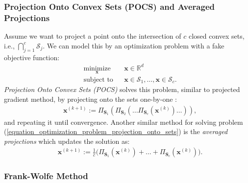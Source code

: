 \documentclass[lang=cn,10pt]{gorgeousnbook}
\numberwithin{equation}{section}%
\numberwithin{figure}{section}%
\begin{document}
\subsubsection{Projection Onto Convex Sets (POCS) and Averaged Projections}


Assume we want to project a point onto the intersection of $c$ closed convex sets, i.e., $\bigcap_{j=1}^c \mathcal{S}_j$. 
We can model this by an optimization problem with a fake objective function:
\begin{equation}\label{equation_optimization_problem_projection_onto_sets}
\begin{aligned}
& \underset{\boldsymbol{x}}{\text{minimize}}
& & \boldsymbol{x} \in \mathbb{R}^d \\
& \text{subject to}
& & \boldsymbol{x} \in \mathcal{S}_1, \dots, \boldsymbol{x} \in \mathcal{S}_c.
\end{aligned}
\end{equation}
\textit{Projection Onto Convex Sets (POCS)} solves this problem, similar to projected gradient method, by projecting onto the sets one-by-one \cite{bauschke1996projection}:
\begin{align}
& \boldsymbol{x}^{(k+1)} := \Pi_{\boldsymbol{S}_1}(\Pi_{\boldsymbol{S}_2}(\dots \Pi_{\boldsymbol{S}_c}(\boldsymbol{x}^{(k)})\dots)),
\end{align}
and repeating it until convergence.
Another similar method for solving problem (\ref{equation_optimization_problem_projection_onto_sets}) is the \textit{averaged projections} which updates the solution as:
\begin{align}
& \boldsymbol{x}^{(k+1)} :=
\frac{1}{c}
\Big(\Pi_{\boldsymbol{S}_1}(\boldsymbol{x}^{(k)}) + \dots + \Pi_{\boldsymbol{S}_c}(\boldsymbol{x}^{(k)})\Big).
\end{align}

\subsubsection{Frank-Wolfe Method}



\end{document}
